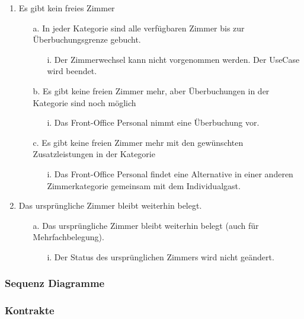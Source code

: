 \documentclass[./detailed_overview_usecases.tex]{subfiles}
\begin{document}
\begin{enumerate}
\begin{itemize}
\begin{itemize}
                \end{itemize}
        \end{itemize}
        \setcounter{enumi}{4}
        \item Es gibt kein freies Zimmer
            \begin{itemize}
                \item[a.] In jeder Kategorie sind alle verfügbaren Zimmer bis zur Überbuchungsgrenze gebucht.
                    \begin{itemize}
                        \item[i.] Der Zimmerwechsel kann nicht vorgenommen werden. Der UseCase wird beendet.
                    \end{itemize}
                \item[b.] Es gibt keine freien Zimmer mehr, aber Überbuchungen in der Kategorie sind noch möglich
                    \begin{itemize}
                        \item[i.] Das Front-Office Personal nimmt eine Überbuchung vor.
                     \end{itemize}
                \item[c.] Es gibt keine freien Zimmer mehr mit den gewünschten Zusatzleistungen in der Kategorie
                        \begin{itemize}
                            \item[i.] Das Front-Office Personal findet eine Alternative in einer anderen Zimmerkategorie gemeinsam mit dem Individualgast.
                        \end{itemize}
            \end{itemize}
        \setcounter{enumi}{6}
        \item Das ursprüngliche Zimmer bleibt weiterhin belegt.
            \begin{itemize}
                \item[a.] Das ursprüngliche Zimmer bleibt weiterhin belegt (auch für Mehrfachbelegung).
                    \begin{itemize}
                        \item[i.] Der Status des ursprünglichen Zimmers wird nicht geändert.
                    \end{itemize}
            \end{itemize}
    \end{enumerate}

    \subsubsection{Sequenz Diagramme}
    \subsubsection{Kontrakte}
\end{document}
